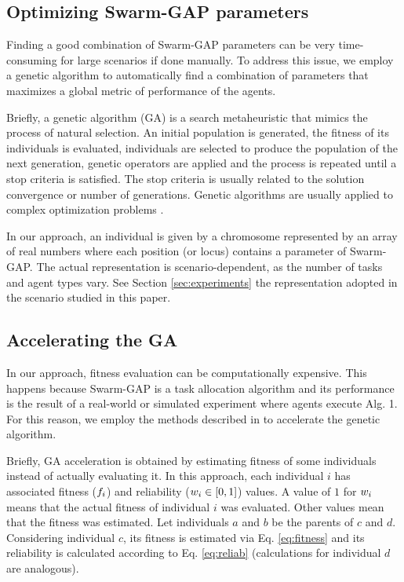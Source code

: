 \documentclass[a4paper]{sbgames}
\begin{document}
\subsection{Optimizing Swarm-GAP parameters}
\label{sec:opt_swgap}
Finding a good combination of Swarm-GAP parameters can be very time-consuming for large scenarios if done manually. To address this issue, we employ a genetic algorithm to automatically find a combination of parameters that maximizes a global metric of performance of the agents.

Briefly, a genetic algorithm (GA) is a search metaheuristic that mimics the process of natural selection. An initial population is generated, the fitness of its individuals is evaluated, individuals are selected to produce the population of the next generation, genetic operators are applied and the process is repeated until a stop criteria is satisfied. The stop criteria is usually related to the solution convergence or number of generations. Genetic algorithms are usually applied to complex optimization problems \cite{Haupt&Haupt2004}.

In our approach, an individual is given by a chromosome represented by an array of real numbers where each position (or locus) contains a parameter of Swarm-GAP. %
The actual representation is scenario-dependent, as the number of tasks and agent types vary. See Section \ref{sec:experiments} the representation adopted in the scenario studied in this paper.

\subsection{Accelerating the GA}
In our approach, fitness evaluation can be computationally expensive. This happens because Swarm-GAP is a task allocation algorithm and its performance is the result of a real-world or simulated experiment where agents execute Alg. 1. For this reason, we employ the methods described in \cite{Salami&Hendtlass2003} to accelerate the genetic algorithm. 

Briefly, GA acceleration is obtained by estimating fitness of some individuals instead of actually evaluating it. In this approach, each individual $i$ has associated fitness ($f_{i}$) and reliability ($w_{i} \in [0,1]$) values. A value of $1$ for $w_{i}$ means that the actual fitness of individual $i$ was evaluated. Other values mean that the fitness was estimated. Let individuals $a$ and $b$ be the parents of $c$ and $d$. Considering individual $c$, its fitness is estimated via Eq. \ref{eq:fitness} and its reliability is calculated according to Eq. \ref{eq:reliab} (calculations for individual $d$ are analogous). 
\end{document}
